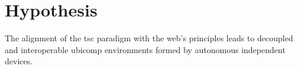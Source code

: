 \section{Hypothesis}
\label{sec:Hypothesis}




The alignment of the \ac{tsc} paradigm with the web's principles leads to decoupled and interoperable \ac{ubicomp} environments formed by autonomous independent devices.


